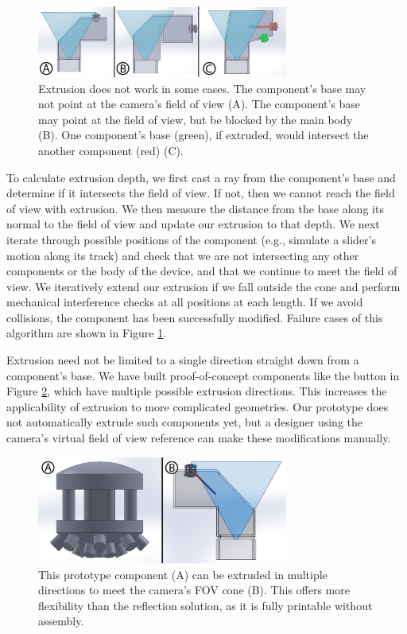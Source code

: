 \begin{figure}
\centering
\includegraphics[width=3.25in]{figures/sauron/extrusion-fails.png}
\caption{Extrusion does not work in some cases.  The component's base may not point at the camera's field of view (A).  The component's base may point at the field of view, but be blocked by the main body (B).  One component's base (green), if extruded, would intersect the another component (red) (C).}
\label{fig:sauron-extrusion-fails}
\end{figure}


To calculate extrusion depth, we first cast a ray from the component's base and determine if it intersects the field of view. If not, then we cannot reach the field of view with extrusion. We then measure the distance from the base along its normal to the field of view and update our extrusion to that depth. We next iterate through possible positions of the component (e.g., simulate a slider's motion along its track) and check that we are not intersecting any other components or the body of the device, and that we continue to meet the field of view. We iteratively extend our extrusion if we fall outside the cone and perform mechanical interference checks at all positions at each length. If we avoid collisions, the component has been successfully modified.  Failure cases of this algorithm are shown in Figure \ref{fig:sauron-extrusion-fails}.

Extrusion need not be limited to a single direction straight down from a component's base. We have built proof-of-concept components like the button in Figure \ref{fig:sauron-extrusion-multi}, which have multiple possible extrusion directions. This increases the applicability of extrusion to more complicated geometries. Our prototype does not automatically extrude such components yet, but a designer using the camera's virtual field of view reference can make these modifications manually.

\begin{figure}
\centering
\includegraphics[width=3.25in]{figures/sauron/extrusion++.png}
\caption{This prototype component (A) can be extruded in multiple directions to meet the camera's FOV cone (B). This offers more flexibility than the reflection solution, as it is fully printable without assembly.
}
\label{fig:sauron-extrusion-multi}
\end{figure}


